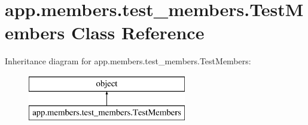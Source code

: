 \hypertarget{classapp_1_1members_1_1test__members_1_1_test_members}{}\section{app.\+members.\+test\+\_\+members.\+Test\+Members Class Reference}
\label{classapp_1_1members_1_1test__members_1_1_test_members}
Inheritance diagram for app.\+members.\+test\+\_\+members.\+Test\+Members\+:\begin{figure}[H]
\begin{center}
\leavevmode
\includegraphics[height=2.000000cm]{classapp_1_1members_1_1test__members_1_1_test_members}
\end{center}
\end{figure}
